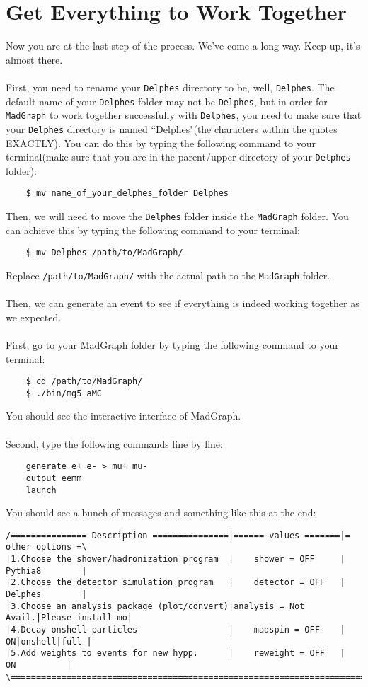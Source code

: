 \documentclass[12pt, english]{article}
\begin{document}
\section{Get Everything to Work Together}
Now you are at the last step of the process. We've come a long way. Keep up, it's almost there. \\\\
First, you need to rename your \texttt{Delphes} directory to be, well, \texttt{Delphes}. The default name of your \texttt{Delphes} folder may not be \texttt{Delphes}, but in order for \texttt{MadGraph} to work together successfully with \texttt{Delphes}, you need to make sure that your \texttt{Delphes} directory is named ``Delphes"(the characters within the quotes EXACTLY). You can do this by typing the following command to your terminal(make sure that you are in the parent/upper directory of your \texttt{Delphes} folder):
\begin{lstlisting}
    $ mv name_of_your_delphes_folder Delphes
\end{lstlisting}
Then, we will need to move the \texttt{Delphes} folder inside the \texttt{MadGraph} folder. You can achieve this by typing the following command to your terminal:
\begin{lstlisting}
    $ mv Delphes /path/to/MadGraph/
\end{lstlisting}
Replace \lstinline{/path/to/MadGraph/} with the actual path to the \texttt{MadGraph} folder. \\\\
Then, we can generate an event to see if everything is indeed working together as we expected. \\\\
First, go to your MadGraph folder by typing the following command to your terminal:
\begin{lstlisting}
    $ cd /path/to/MadGraph/
    $ ./bin/mg5_aMC
\end{lstlisting}
You should see the interactive interface of MadGraph. \\\\
Second, type the following commands line by line: 
\begin{lstlisting}
    generate e+ e- > mu+ mu-
    output eemm
    launch
\end{lstlisting}
You should see a bunch of messages and something like this at the end: 
{\scriptsize
\begin{lstlisting}
/=============== Description ===============|====== values =======|= other options =\
|1.Choose the shower/hadronization program  |    shower = OFF     |  Pythia8        |
|2.Choose the detector simulation program   |    detector = OFF   |  Delphes        |
|3.Choose an analysis package (plot/convert)|analysis = Not Avail.|Please install mo|
|4.Decay onshell particles                  |    madspin = OFF    | ON|onshell|full |
|5.Add weights to events for new hypp.      |    reweight = OFF   |     ON          |
\===================================================================================/
\end{lstlisting}
}
\end{document}
